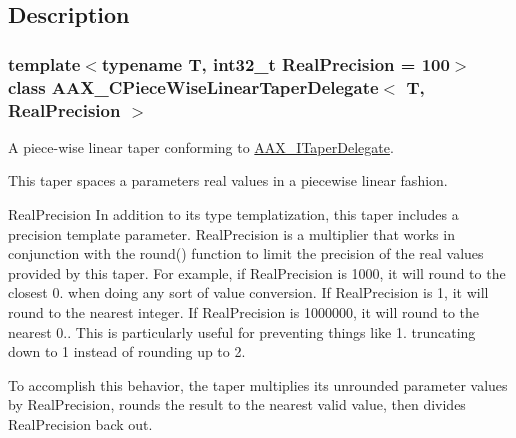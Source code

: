\subsection{Description}
\subsubsection*{template$<$typename T, int32\+\_\+t Real\+Precision = 100$>$\newline
class A\+A\+X\+\_\+\+C\+Piece\+Wise\+Linear\+Taper\+Delegate$<$ T, Real\+Precision $>$}

A piece-\/wise linear taper conforming to \mbox{\hyperlink{a01881}{A\+A\+X\+\_\+\+I\+Taper\+Delegate}}. 

This taper spaces a parameter\textquotesingle{}s real values in a piecewise linear fashion.

\begin{DoxyParagraph}{Real\+Precision}
In addition to its type templatization, this taper includes a precision template parameter. Real\+Precision is a multiplier that works in conjunction with the round() function to limit the precision of the real values provided by this taper. For example, if Real\+Precision is 1000, it will round to the closest 0. when doing any sort of value conversion. If Real\+Precision is 1, it will round to the nearest integer. If Real\+Precision is 1000000, it will round to the nearest 0.. This is particularly useful for preventing things like 1. truncating down to 1 instead of rounding up to 2.
\end{DoxyParagraph}
To accomplish this behavior, the taper multiplies its unrounded parameter values by Real\+Precision, rounds the result to the nearest valid value, then divides Real\+Precision back out.

